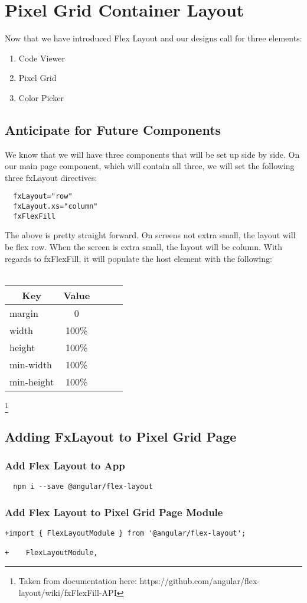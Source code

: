 \maketitle{}
\section{ Pixel Grid Container Layout }

Now that we have introduced Flex Layout and our designs call for three elements:
\begin{enumerate}
  \item Code Viewer
  \item Pixel Grid
  \item Color Picker
\end{enumerate}

\subsection{ Anticipate for Future Components }

We know that we will have three components that will be set up side by side.
On our main page component, which will contain all three, we will set the
following three fxLayout directives:
\begin{verbatim}
  fxLayout="row"
  fxLayout.xs="column"
  fxFlexFill
\end{verbatim}

The above is pretty straight forward. On screens not extra small, the layout
will be flex row. When the screen is extra small, the layout will be column.
With regards to fxFlexFill, it will populate the host element with the following:
\\
\\
\begin{tabular}{@{} l *4c @{}}
\toprule
 \multicolumn{1}{c}{Key} & Value \\
\midrule
 margin & 0         \\
 width  & 100\%     \\
 height & 100\%     \\
 min-width & 100\%  \\
 min-height & 100\% \\
\end{tabular}
\footnote{Taken from documentation here:
https://github.com/angular/flex-layout/wiki/fxFlexFill-API}

\subsection{ Adding FxLayout to Pixel Grid Page }

\subsubsection{ Add Flex Layout to App }
\begin{verbatim}
  npm i --save @angular/flex-layout
\end{verbatim}

\subsubsection{ Add Flex Layout to Pixel Grid Page Module }
\begin{lstlisting}
+import { FlexLayoutModule } from '@angular/flex-layout';

+    FlexLayoutModule,
\end{lstlisting}
